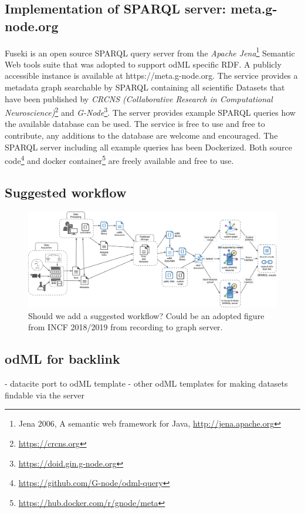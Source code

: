 \documentclass{article}
\begin{document}
\subsection{Implementation of SPARQL server: meta.g-node.org}

Fuseki is an open source SPARQL query server from the \textit{Apache Jena}\footnote{Jena 2006, A semantic web framework for Java, \url{http://jena.apache.org}} Semantic Web tools suite that was adopted to support odML specific RDF. A publicly accessible instance is available at https://meta.g-node.org. The service provides a metadata graph searchable by SPARQL containing all scientific Datasets that have been published by \textit{CRCNS (Collaborative Research in Computational
Neuroscience)}\footnote{\url{https://crcns.org}} and \textit{G-Node}\footnote{\url{https://doid.gin.g-node.org}}. The server provides example SPARQL queries how the available database can be used. The service is free to use and free to contribute, any additions to the database are welcome and encouraged.
The SPARQL server including all example queries has been Dockerized. Both source code\footnote{\url{https://github.com/G-node/odml-query}} and docker container\footnote{\url{https://hub.docker.com/r/gnode/meta}} are freely available and free to use.

\subsection{Suggested workflow}

\begin{figure}
\begin{center}
\includegraphics[width=0.90\columnwidth]{figures/workflowSchema.pdf}
\caption{Should we add a suggested workflow? Could be an adopted figure from INCF 2018/2019 from recording to graph server.}
\label{fig:workflowSchema}
\end{center}
\end{figure}

\subsection{odML for backlink}
- datacite port to odML template
- other odML templates for making datasets findable via the server
\end{document}
